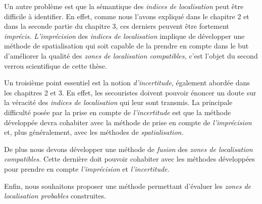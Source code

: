 Un autre problème est que la sémantique des \emph{indices de
  localisation} peut être difficile à identifier. En effet, comme nous
l'avons expliqué dans le chapitre 2 et dans la seconde partie du
chapitre 3, ces derniers peuvent être fortement \emph{imprécis.}
\emph{L'imprécision} des \emph{indices de localisation} implique de
développer une méthode de spatialisation qui soit capable de la
prendre en compte dans le but d'améliorer la qualité des \emph{zones
  de localisation compatibles,} c'est l'objet du second verrou
scientifique de cette thèse.

Un troisième point essentiel est la notion \emph{d'incertitude},
également abordée dans les chapitres 2 et 3. En effet, les secouristes
doivent pouvoir énoncer un doute sur la véracité des \emph{indices de
  localisation} qui leur sont transmis. La principale difficulté posée
par la prise en compte de \emph{l'incertitude} est que la méthode
développée devra cohabiter avec la méthode de prise en compte de
\emph{l'imprécision} et, plus généralement, avec les méthodes de
\emph{spatialisation.}

De plus nous devons développer une méthode de \emph{fusion} des
\emph{zones de localisation compatibles.} Cette dernière doit pouvoir
cohabiter avec les méthodes développées pour prendre en compte
\emph{l'imprécision} et \emph{l'incertitude.}

Enfin, nous souhaitons proposer une méthode permettant d'évaluer les
\emph{zones de localisation probables} construites.




